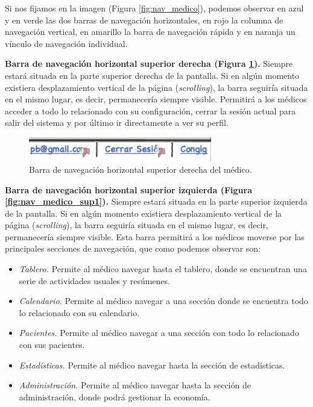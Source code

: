 			Si nos fijamos en la imagen (Figura \ref{fig:nav_medico}), podemos observar en azul y en verde las dos barras de navegación horizontales, en rojo la columna de navegación vertical, en amarillo la barra de navegación rápida y en naranja un vínculo de navegación individual.
			
			\textbf{Barra de navegación horizontal superior derecha (Figura \ref{fig:nav_medico_sup2}).} Siempre estará situada en la parte superior derecha de la pantalla. Si en algún momento existiera desplazamiento vertical de la página (\textit{scrolling}), la barra seguiría situada en el mismo lugar, es decir, permanecería siempre visible. Permitirá a los médicos acceder a todo lo relacionado con su configuración, cerrar la sesión actual para salir del sistema y por último ir directamente a ver su perfil.
			
			\begin{figure}[H]
			  \centering
			    \includegraphics[width=8cm]{img/jpg/nav/medico_sup2.jpg}
			  \caption{Barra de navegación horizontal superior derecha del médico.}
			  \label{fig:nav_medico_sup2}
			\end{figure}
			
			
			\textbf{Barra de navegación horizontal superior izquierda (Figura \ref{fig:nav_medico_sup1}).} Siempre estará situada en la parte superior izquierda de la pantalla. Si en algún momento existiera desplazamiento vertical de la página (\textit{scrolling}), la barra seguiría situada en el mismo lugar, es decir, permanecería siempre visible. Esta barra permitirá a los médicos moverse por las principales secciones de navegación, que como podemos observar son:
			\begin{itemize}
				\item \textit{Tablero.} Permite al médico navegar hasta el tablero, donde se encuentran una serie de actividades usuales y resúmenes.
				\item \textit{Calendario.} Permite al médico navegar a una sección donde se encuentra todo lo relacionado con su calendario.
				\item \textit{Pacientes.} Permite al médico navegar a una sección con todo lo relacionado con sus pacientes.
				\item \textit{Estadísticas.} Permite al médico navegar hasta la sección de estadísticas.
				\item \textit{Administración.} Permite al médico navegar hasta la sección de administración, donde podrá gestionar la economía.
			\end{itemize}
			
